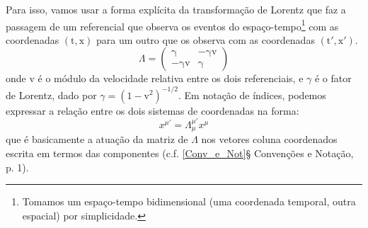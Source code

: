 \documentclass[12pt,a4paper]{article}
\begin{document}
Para isso, vamos   usar a forma explícita da transformação de Lorentz que faz a passagem de
um referencial que observa os eventos do espaço-tempo\footnote{Tomamos um espaço-tempo bidimensional (uma coordenada temporal, outra espacial) por simplicidade.} com as coordenadas $\mathrm{(t,x)}$ para um outro que
os observa com as coordenadas $\mathrm{(t',x')}$.
\begin{equation*}
  \Lambda = \begin{pmatrix*} \mathrm{\gamma} &  \mathrm{-\gamma v}\\
                          \mathrm{-\gamma v} & \mathrm{\gamma}  \end{pmatrix*}
\end{equation*}
onde $\mathrm{v}$ é o módulo da velocidade relativa entre os dois referenciais, e $\gamma$ é o fator de Lorentz, dado por
$\gamma = \mathrm{(1-v^2)^{-1/2}}$. Em notação de índices, podemos expressar a relação entre os dois sistemas 
de coordenadas na forma:
\begin{equation*}
x^{\mu'} = \Lambda^{\mu'}_{\mu} x^{\mu}
\end{equation*}
que é basicamente a atuação da matriz de $\Lambda$ nos vetores coluna coordenados escrita em termos das componentes (c.f. \ref{Conv_e_Not}{§ Convenções e Notação}, p. 1).
\end{document}
